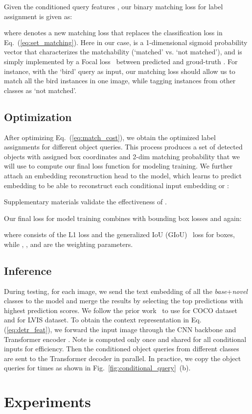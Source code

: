 \documentclass[runningheads]{llncs}
\begin{document}
Given the conditioned query features , our binary matching loss for label assignment is given as:

where  denotes a new matching loss that replaces the classification loss  in Eq.~(\ref{eq:set_matching}).
Here in our case,  is a 1-dimensional sigmoid probability vector that characterizes the matchability (`matched' vs. `not matched'), and  is simply implemented by a Focal loss~\cite{lin2017focal}  between predicted  and groud-truth .
For instance, with the `bird' query as input, our matching loss should allow us to match all the bird instances in one image, while tagging instances from other classes as `not matched'.

\subsection{Optimization}
After optimizing Eq.~(\ref{eq:match_cost}), we obtain the optimized label assignments  for different object queries. This process produces a set of detected objects with assigned box coordinates  and 2-dim matching probability  that we will use to compute our final loss function for modeling training. We further attach an embedding reconstruction head to the model, which learns to predict embedding  to be able to reconstruct each conditional input embedding  or :

Supplementary materials validate the effectiveness of .

Our final loss for model training combines  with bounding box losses  and  again:

where  consists of the L1 loss and the generalized IoU (GIoU)~\cite{rezatofighi2019generalized} loss for boxes, while , ,  and  are the  weighting parameters.

\subsection{Inference} \label{sec:inference}
During testing, for each image, we send the text embedding  of all the \textit{base}+\textit{novel} classes to the model and merge the results by selecting the top  predictions with highest prediction scores.
We follow the prior work~\cite{gu2021open} to use  for COCO dataset and  for LVIS dataset.
To obtain the context representation  in Eq. (\ref{eq:detr_feat}), we forward the input image through the CNN backbone  and Transformer encoder . Note  is computed only once and shared for all conditional inputs for efficiency. Then the conditioned object queries from different classes are sent to the Transformer decoder in parallel. In practice, we copy the object queries for  times as shown in Fig.~\ref{fig:conditional_query}~(b). \section{Experiments}
\end{document}
